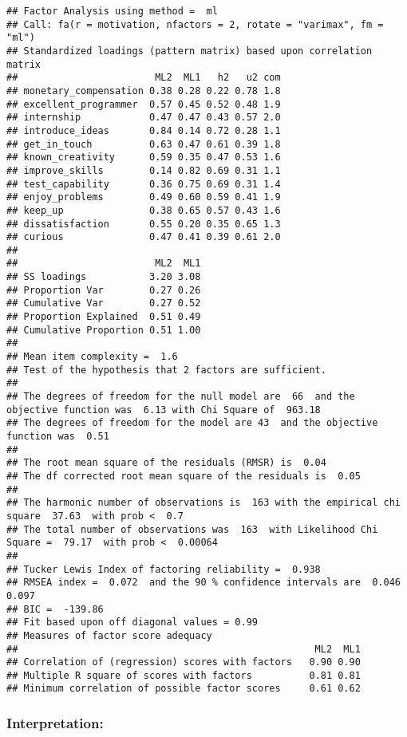\documentclass[
]{article}
\begin{document}
\begin{verbatim}
## Factor Analysis using method =  ml
## Call: fa(r = motivation, nfactors = 2, rotate = "varimax", fm = "ml")
## Standardized loadings (pattern matrix) based upon correlation matrix
##                        ML2  ML1   h2   u2 com
## monetary_compensation 0.38 0.28 0.22 0.78 1.8
## excellent_programmer  0.57 0.45 0.52 0.48 1.9
## internship            0.47 0.47 0.43 0.57 2.0
## introduce_ideas       0.84 0.14 0.72 0.28 1.1
## get_in_touch          0.63 0.47 0.61 0.39 1.8
## known_creativity      0.59 0.35 0.47 0.53 1.6
## improve_skills        0.14 0.82 0.69 0.31 1.1
## test_capability       0.36 0.75 0.69 0.31 1.4
## enjoy_problems        0.49 0.60 0.59 0.41 1.9
## keep_up               0.38 0.65 0.57 0.43 1.6
## dissatisfaction       0.55 0.20 0.35 0.65 1.3
## curious               0.47 0.41 0.39 0.61 2.0
## 
##                        ML2  ML1
## SS loadings           3.20 3.08
## Proportion Var        0.27 0.26
## Cumulative Var        0.27 0.52
## Proportion Explained  0.51 0.49
## Cumulative Proportion 0.51 1.00
## 
## Mean item complexity =  1.6
## Test of the hypothesis that 2 factors are sufficient.
## 
## The degrees of freedom for the null model are  66  and the objective function was  6.13 with Chi Square of  963.18
## The degrees of freedom for the model are 43  and the objective function was  0.51 
## 
## The root mean square of the residuals (RMSR) is  0.04 
## The df corrected root mean square of the residuals is  0.05 
## 
## The harmonic number of observations is  163 with the empirical chi square  37.63  with prob <  0.7 
## The total number of observations was  163  with Likelihood Chi Square =  79.17  with prob <  0.00064 
## 
## Tucker Lewis Index of factoring reliability =  0.938
## RMSEA index =  0.072  and the 90 % confidence intervals are  0.046 0.097
## BIC =  -139.86
## Fit based upon off diagonal values = 0.99
## Measures of factor score adequacy             
##                                                    ML2  ML1
## Correlation of (regression) scores with factors   0.90 0.90
## Multiple R square of scores with factors          0.81 0.81
## Minimum correlation of possible factor scores     0.61 0.62
\end{verbatim}

\hypertarget{interpretation-7}{%
\subsubsection{Interpretation:}\label{interpretation-7}}
\end{document}
